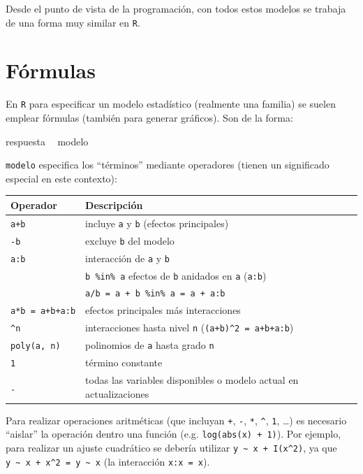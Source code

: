 \documentclass[]{book}
\newenvironment{Shaded}{\begin{snugshade}}{\end{snugshade}}
\newcommand{\StringTok}[1]{\textcolor[rgb]{0.31,0.60,0.02}{#1}}
\newcommand{\OperatorTok}[1]{\textcolor[rgb]{0.81,0.36,0.00}{\textbf{#1}}}
\newcommand{\NormalTok}[1]{#1}
\begin{document}
Desde el punto de vista de la programación, con todos estos modelos se
trabaja de una forma muy similar en \texttt{R}.

\section{Fórmulas}\label{formulas}

En \texttt{R} para especificar un modelo estadístico (realmente una
familia) se suelen emplear fórmulas (también para generar gráficos). Son
de la forma:

\begin{Shaded}
\begin{Highlighting}[]
\NormalTok{respuesta }\OperatorTok{~}\StringTok{ }\NormalTok{modelo}
\end{Highlighting}
\end{Shaded}

\texttt{modelo} especifica los ``términos'' mediante operadores (tienen
un significado especial en este contexto):

\begin{longtable}[]{@{}ll@{}}
\toprule
Operador & Descripción\tabularnewline
\midrule
\endhead
\texttt{a+b} & incluye \texttt{a} y \texttt{b} (efectos
principales)\tabularnewline
\texttt{-b} & excluye \texttt{b} del modelo\tabularnewline
\texttt{a:b} & interacción de \texttt{a} y \texttt{b}\tabularnewline
\ & \texttt{b\ \%in\%\ a} efectos de \texttt{b} anidados en \texttt{a}
(\texttt{a:b})\tabularnewline
\ & \texttt{a/b\ =\ a\ +\ b\ \%in\%\ a\ =\ a\ +\ a:b}\tabularnewline
\texttt{a*b\ =\ a+b+a:b} & efectos principales más
interacciones\tabularnewline
\texttt{\^{}n} & interacciones hasta nivel \texttt{n}
(\texttt{(a+b)\^{}2\ =\ a+b+a:b})\tabularnewline
\texttt{poly(a,\ n)} & polinomios de \texttt{a} hasta grado
\texttt{n}\tabularnewline
\texttt{1} & término constante\tabularnewline
\texttt{.} & todas las variables disponibles o modelo actual en
actualizaciones\tabularnewline
\bottomrule
\end{longtable}

Para realizar operaciones aritméticas (que incluyan \texttt{+},
\texttt{-}, \texttt{*}, \texttt{\^{}}, \texttt{1}, \ldots{}) es
necesario ``aislar'' la operación dentro una función (e.g.
\texttt{log(abs(x)\ +\ 1)}). Por ejemplo, para realizar un ajuste
cuadrático se debería utilizar
\texttt{y\ \textasciitilde{}\ x\ +\ I(x\^{}2)}, ya que
\texttt{y\ \textasciitilde{}\ x\ +\ x\^{}2\ =\ y\ \textasciitilde{}\ x}
(la interacción \texttt{x:x\ =\ x}).
\end{document}
